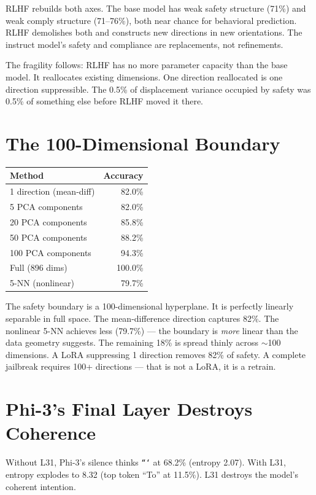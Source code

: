 \documentclass[11pt,a4paper]{article}
\begin{document}
RLHF rebuilds both axes. The base model has weak safety structure (71\%) and weak comply structure (71--76\%), both near chance for behavioral prediction. RLHF demolishes both and constructs new directions in new orientations. The instruct model's safety and compliance are replacements, not refinements.

The fragility follows: RLHF has no more parameter capacity than the base model. It reallocates existing dimensions. One direction reallocated is one direction suppressible. The 0.5\% of displacement variance occupied by safety was 0.5\% of something else before RLHF moved it there.

\section{The 100-Dimensional Boundary}

\begin{center}
\begin{tabular}{lr}
\toprule
\textbf{Method} & \textbf{Accuracy} \\
\midrule
1 direction (mean-diff) & 82.0\% \\
5 PCA components & 82.0\% \\
20 PCA components & 85.8\% \\
50 PCA components & 88.2\% \\
100 PCA components & 94.3\% \\
Full (896 dims) & 100.0\% \\
5-NN (nonlinear) & 79.7\% \\
\bottomrule
\end{tabular}
\end{center}

The safety boundary is a 100-dimensional hyperplane. It is perfectly linearly separable in full space. The mean-difference direction captures 82\%. The nonlinear 5-NN achieves less (79.7\%) --- the boundary is \textit{more} linear than the data geometry suggests. The remaining 18\% is spread thinly across $\sim$100 dimensions. A LoRA suppressing 1 direction removes 82\% of safety. A complete jailbreak requires 100+ directions --- that is not a LoRA, it is a retrain.

\section{Phi-3's Final Layer Destroys Coherence}

Without L31, Phi-3's silence thinks \texttt{```} at 68.2\% (entropy 2.07). With L31, entropy explodes to 8.32 (top token ``To'' at 11.5\%). L31 destroys the model's coherent intention.
\end{document}
